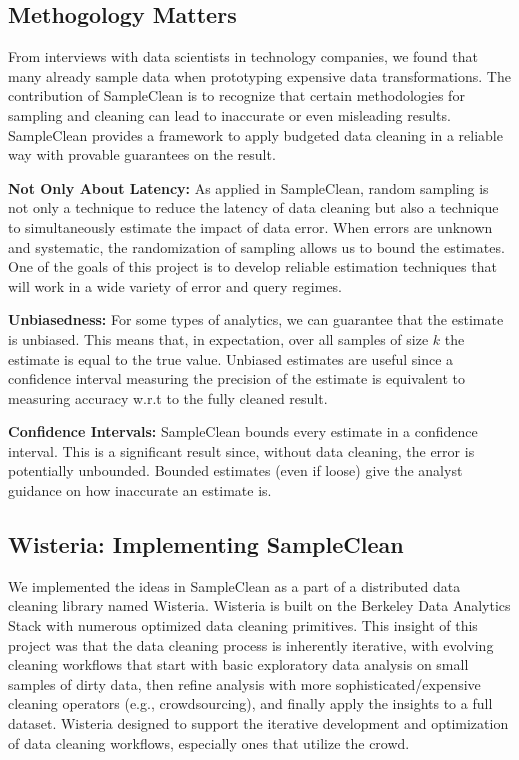 \subsection{Methogology Matters}
From interviews with data scientists in technology companies, we found that many already sample data when prototyping expensive data transformations.
The contribution of SampleClean is to recognize that certain methodologies for sampling and cleaning can lead to inaccurate or even misleading results.
SampleClean provides a framework to apply budgeted data cleaning in a reliable way with provable guarantees on the result.

\vspace{0.5em}
\noindent\textbf{Not Only About Latency: } As applied in SampleClean, random sampling is not only a technique to reduce the latency of data cleaning but also a technique to simultaneously estimate the impact of data error.
When errors are unknown and systematic, the randomization of sampling allows us to bound the estimates.
One of the goals of this project is to develop reliable estimation techniques that will work in a wide variety of error and query regimes.

\vspace{0.5em}
\noindent\textbf{Unbiasedness: } For some types of analytics, we can guarantee that the estimate is unbiased. This means that, in expectation, over all samples of size $k$ the estimate is equal to the true value. Unbiased estimates are useful since a confidence interval measuring the precision of the estimate is equivalent to measuring accuracy w.r.t to the fully cleaned result.

\vspace{0.5em}
\noindent\textbf{Confidence Intervals: } SampleClean bounds every estimate in a confidence interval. This is a significant result since, without data cleaning, the error is potentially unbounded. Bounded estimates (even if loose) give the analyst guidance on how inaccurate an estimate is.

\subsection{Wisteria: Implementing SampleClean \cite{haas2015wisteria}}
We implemented the ideas in SampleClean as a part of a distributed data cleaning library named Wisteria.
Wisteria is built on the Berkeley Data Analytics Stack with numerous optimized data cleaning primitives.
This insight of this project was that the data cleaning process is inherently iterative, with evolving cleaning workflows that 
start with basic exploratory data analysis on small samples of dirty data, then refine analysis with 
more sophisticated/expensive cleaning operators (e.g., crowdsourcing), and finally apply the insights to a full dataset.
Wisteria designed to support the iterative development and optimization of data cleaning workflows, especially ones that utilize the crowd.

